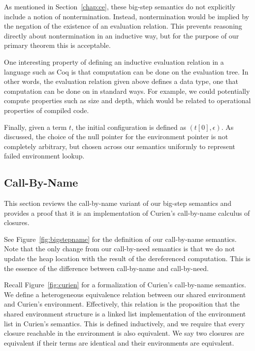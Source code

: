 As mentioned in Section~\ref{chap:ce}, these big-step semantics do not
explicitly include a notion of nontermination. Instead, nontermination would be
implied by the negation of the existence of an evaluation relation. This
prevents reasoning directly about nontermination in an inductive way, but for
the purpose of our primary theorem this is acceptable. 

One interesting property of defining an inductive evaluation relation in a
language such as Coq is that computation can be done on the evaluation tree. In
other words, the evaluation relation given above defines a data type, one that
computation can be done on in standard ways. For example, we could potentially
compute properties such as size and depth, which would be related to operational
properties of compiled code. 

Finally, given a term $t$, the initial configuration is defined as
$\left(t\left[0\right], \epsilon\right)$. As discussed, the choice of the null
pointer for the environment pointer is not completely arbitrary, but chosen
across our semantics uniformly to represent failed environment lookup. 

\subsection{Call-By-Name}

This section reviews the call-by-name variant of our big-step semantics and
provides a proof that it is an implementation of Curien's call-by-name calculus
of closures. 

See Figure~\ref{fig:bigstepname} for the definition of our call-by-name
semantics. Note that the only change from our call-by-need semantics is that we
do not update the heap location with the result of the dereferenced computation.
This is the essence of the difference between call-by-name and call-by-need.

Recall Figure~\ref{fig:curien} for a formalization of Curien's call-by-name
semantics. We define a heterogeneous equivalence relation between our shared
environment and Curien's environment. Effectively, this relation is the
proposition that the shared environment structure is a linked list
implementation of the environment list in Curien's semantics. This is defined
inductively, and we require that every closure reachable in the environment is
also equivalent.  We say two closures are equivalent if their terms are
identical and their environments are equivalent. 

